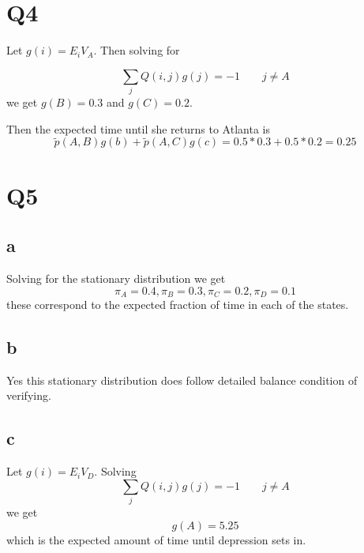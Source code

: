 \documentclass{article}
\begin{document}
\section*{Q4}
Let $g(i) = E_iV_A$. Then solving for

$$
\sum_j Q(i,j)g(j) = -1 \qquad j \neq A
$$
we get $g(B) = 0.3$ and $g(C) = 0.2$.

Then the expected time until she returns to Atlanta is 
$$
\tilde{p}(A,B)g(b) + \tilde{p}(A,C)g(c) = 0.5 * 0.3 + 0.5 * 0.2 = 0.25
$$


\section*{Q5}
\subsection*{a}
Solving for the stationary distribution we get
$$
\pi_A = 0.4, \pi_B = 0.3, \pi_C = 0.2, \pi_D = 0.1
$$
these correspond to the expected fraction of time in each of the states. 

\subsection*{b}
Yes this stationary distribution does follow detailed balance condition of verifying. 

\subsection*{c}
Let $g(i) = E_iV_D$.
Solving 
$$
\sum_j Q(i,j)g(j) = -1 \qquad j \neq A
$$
we get 
$$
g(A) = 5.25
$$
which is the expected amount of time until depression sets in. 
\end{document}
